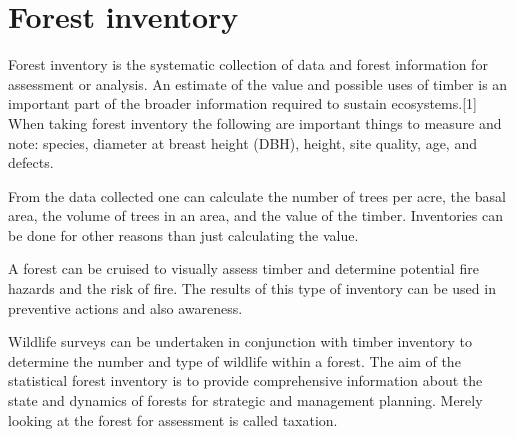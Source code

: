 \section{Forest inventory}
Forest inventory is the systematic collection of data and forest information for assessment or analysis. 
An estimate of the value and possible uses of timber is an important part of the broader information required 
to sustain ecosystems.[1] When taking forest inventory the following are important things to measure and 
note: species, diameter at breast height (DBH), height, site quality, age, and defects. 

From the data collected one can calculate the number of trees per acre, the basal area, the volume of trees in an area, 
and the value of the timber. Inventories can be done for other reasons than just calculating the value. 

A forest can be cruised to visually assess timber and determine potential fire hazards and the risk of fire. 
The results of this type of inventory can be used in preventive actions and also awareness. 

Wildlife surveys can be undertaken in conjunction with timber inventory to determine the number and type of wildlife within a forest. 
The aim of the statistical forest inventory is to provide comprehensive information about the state and dynamics of forests for strategic and management planning. 
Merely looking at the forest for assessment is called taxation. 


